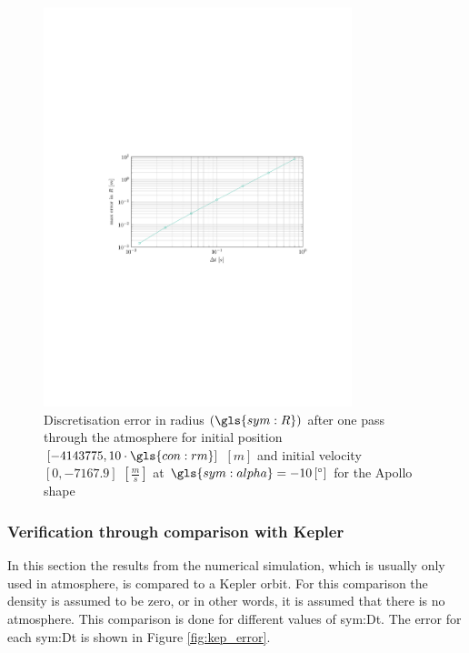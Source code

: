 \begin{figure}[h]
	\centering
	\includegraphics[trim={4.25cm 10cm 3.2cm 10cm},clip,width=0.8\textwidth]{Figure/orbital_model/dicretization.pdf}
	\caption[Discretisation error in radius $\left(\gls{sym:R}\right)$ after one pass through the atmosphere for the rigid shape]{Discretisation error in radius $\left(\gls{sym:R}\right)$ after one pass through the atmosphere for initial position $\left[-4143775,10\cdot\gls{con:rm}\right]$ $\left[m\right]$ and initial velocity $\left[0,-7167.9\right]$ $\left[\frac{m}{s}\right]$ at $\gls{sym:alpha}=-10\left[^\circ\right]$ for the Apollo shape}
	\label{fig:atmos_disc}
\end{figure}

\subsubsection{Verification through comparison with Kepler}
\label{sec:astroverf}

In this section the results from the numerical simulation, which is usually only used in atmosphere, is compared to a Kepler orbit. For this comparison the density is assumed to be zero, or in other words, it is assumed that there is no atmosphere. This comparison is done for different values of \gls{sym:Dt}. The error for each \gls{sym:Dt} is shown in Figure \ref{fig:kep_error}.

